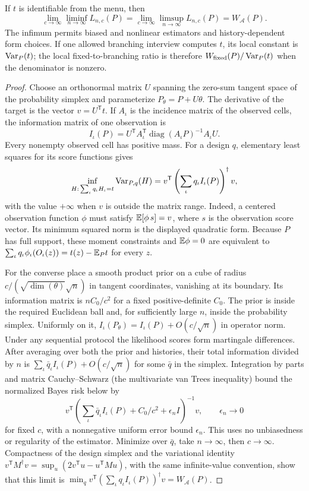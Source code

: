 \begin{proposition}\label{prop:local}
If $t$ is identifiable from the menu, then
\[
 \lim_{c\to\infty}\liminf_{n\to\infty}L_{n,c}(P)
 =\lim_{c\to\infty}\limsup_{n\to\infty}L_{n,c}(P)
 =W_{\mathcal A}(P).
\]
The infimum permits biased and nonlinear estimators and history-dependent
form choices. If one allowed branching interview computes $t$, its local
constant is $\operatorname{Var}_P(t)$; the local fixed-to-branching ratio is therefore
$W_{\rm fixed}(P)/\operatorname{Var}_P(t)$ when the denominator is nonzero.
\end{proposition}
\begin{proof}
Choose an orthonormal matrix $U$ spanning the zero-sum tangent space of the
probability simplex and parameterize $P_\theta=P+U\theta$. The derivative of
the target is the vector $v=U^{\mathsf T}t$. If $A_\iota$ is the incidence matrix
of the observed cells, the information matrix of one observation is
\[
 I_\iota(P)=U^{\mathsf T}A_\iota^{\mathsf T}
           \operatorname{diag}(A_\iota P)^{-1}A_\iota U.
\]
Every nonempty observed cell has positive mass. For a design $q$, elementary
least squares for its score functions gives
\[
 \inf_{H:\,\sum_\iota q_\iota H_\iota=t}\operatorname{Var}_{P,q}(H)
     =v^{\mathsf T}\left(\sum_\iota q_\iota I_\iota(P)\right)^\dagger v,
\]
with the value $+\infty$ when $v$ is outside the matrix range.
Indeed, a centered observation function $\phi$ must satisfy
$\mathbb{E}[\phi\,s]=v$, where $s$ is the observation score vector. Its
minimum squared norm is the displayed quadratic form. Because $P$ has full
support, these moment constraints and $\mathbb{E}\phi=0$ are equivalent to
$\sum_\iota q_\iota\phi_\iota(O_\iota(z))=t(z)-\mathbb{E}_Pt$ for every $z$.

For the converse place a smooth product prior on a cube of radius
$c/(\sqrt{\dim(\theta)}\sqrt n)$ in tangent coordinates, vanishing at its
boundary. Its information matrix is $nC_0/c^2$ for a fixed positive-definite
$C_0$. The prior is inside the required Euclidean ball and, for sufficiently
large $n$, inside the probability simplex. Uniformly on it,
$I_\iota(P_\theta)=I_\iota(P)+O(c/\sqrt n)$ in operator norm. Under any sequential
protocol the likelihood scores form martingale differences. After averaging
over both the prior and histories, their total information divided by $n$
is $\sum_\iota\bar q_\iota I_\iota(P)+O(c/\sqrt n)$ for some $\bar q$ in the simplex.
Integration by parts and matrix Cauchy--Schwarz (the multivariate van Trees
inequality) bound the normalized Bayes risk below by
\[
 v^{\mathsf T}\left(\sum_\iota\bar q_\iota I_\iota(P)+C_0/c^2+
                 \epsilon_n I\right)^{-1}v,
 \qquad \epsilon_n\to0
\]
for fixed $c$, with a nonnegative uniform error bound $\epsilon_n$.
This uses no unbiasedness or regularity of the estimator.
Minimize over $\bar q$, take $n\to\infty$, then $c\to\infty$.
Compactness of the design simplex and the variational identity
$v^{\mathsf T}M^\dagger v=\sup_u(2v^{\mathsf T}u-u^{\mathsf T}Mu)$,
with the same infinite-value convention, show that this limit is
$\min_qv^{\mathsf T}(\sum_\iota q_\iota I_\iota(P))^\dagger v=W_{\mathcal A}(P)$.


\end{proof}
